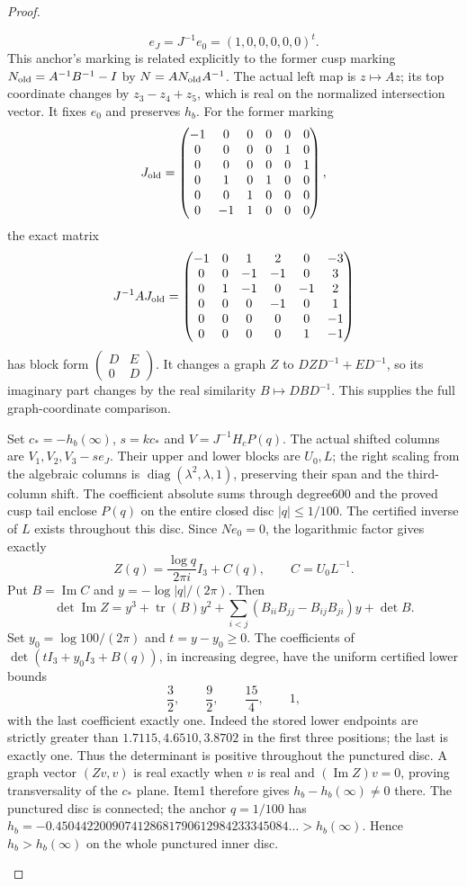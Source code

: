 \begin{proof}
\begin{enumerate}[label=\arabic*.]
\[ e_J=J^{-1}e_0=(1,0,0,0,0,0)^t.
\]
This anchor's marking is related explicitly to the former cusp
marking $N_{\rm old}=A^{-1}B^{-1}-I$ by
$N=AN_{\rm old}A^{-1}$.
The actual left map is $z\mapsto Az$; its top coordinate changes
by $z_3-z_4+z_5$, which is real on the normalized intersection
vector.  It fixes $e_0$ and preserves $h_b$.
For the former marking
\[
 J_{\rm old}=\begin{pmatrix}
 -1&0&0&0&0&0\\0&0&0&0&1&0\\0&0&0&0&0&1\\
 0&1&0&1&0&0\\0&0&1&0&0&0\\0&-1&1&0&0&0
 \end{pmatrix},
\]
the exact matrix
\[
 J^{-1}AJ_{\rm old}=
 \begin{pmatrix}
 -1&0&1&2&0&-3\\0&0&-1&-1&0&3\\0&1&-1&0&-1&2\\
 0&0&0&-1&0&1\\0&0&0&0&0&-1\\0&0&0&0&1&-1
 \end{pmatrix}
\]
has block form $\left(\begin{smallmatrix}D&E\\0&D\end{smallmatrix}\right)$.
It changes a graph $Z$ to $DZD^{-1}+ED^{-1}$, so its imaginary
part changes by the real similarity $B\mapsto DBD^{-1}$.
This supplies the full graph-coordinate comparison.

Set $c_*=-h_b(\infty)$, $s=kc_*$ and $V=J^{-1}H_cP(q)$.
The actual shifted columns are $V_1,V_2,V_3-se_J$.
Their upper and lower blocks are $U_0,L$; the right scaling
from the algebraic columns is
$\operatorname{diag}(\lambda^2,\lambda,1)$, preserving their
span and the third-column shift.
The coefficient absolute sums through degree600 and the proved
cusp tail enclose $P(q)$ on the entire closed disc $|q|\le1/100$.
The certified inverse of $L$ exists throughout this disc.
Since $Ne_0=0$, the logarithmic factor gives exactly
\[
 Z(q)=\frac{\log q}{2\pi i}I_3+C(q),\qquad C=U_0L^{-1}.
\]
Put $B=\operatorname{Im}C$ and $y=-\log|q|/(2\pi)$. Then
\[
 \det\operatorname{Im}Z
 =y^3+\operatorname{tr}(B)y^2
  +\sum_{i<j}(B_{ii}B_{jj}-B_{ij}B_{ji})y+\det B.
 \tag{1.18.6}
\]
Set $y_0=\log100/(2\pi)$ and $t=y-y_0\ge0$.
The coefficients of
$\det(tI_3+y_0I_3+B(q))$, in increasing degree, have the
uniform certified lower bounds
\[
 \frac32,\qquad\frac92,\qquad\frac{15}4,\qquad1,
\]
with the last coefficient exactly one.
Indeed the stored lower endpoints are strictly greater than $1.7115,4.6510,3.8702$ in the first
three positions; the last is exactly one.
Thus the determinant is positive throughout the punctured disc.
A graph vector $(Zv,v)$ is real exactly when $v$ is real and
$(\operatorname{Im}Z)v=0$, proving transversality of the
$c_*$ plane. Item1 therefore gives
$h_b-h_b(\infty)\ne0$ there. The punctured disc is connected;
the anchor $q=1/100$ has
$h_b=-0.4504422009074128681790612984233345084\ldots>h_b(\infty)$.
Hence $h_b>h_b(\infty)$ on the whole punctured inner disc.


\end{enumerate}
\end{proof}
